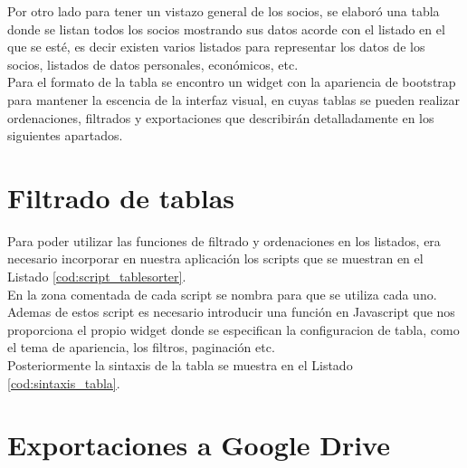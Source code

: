



Por otro lado para tener un vistazo general de los socios, se elaboró una tabla donde se listan todos los socios mostrando sus datos acorde con el listado en el que se esté, es decir existen varios listados para representar los 
datos de los socios, listados de datos personales, económicos, etc.\\

Para el formato de la tabla se encontro un widget con la  apariencia de bootstrap para mantener la escencia de la interfaz visual, en cuyas tablas se pueden
realizar ordenaciones, filtrados y exportaciones que describirán detalladamente en los siguientes apartados.

\section{Filtrado de tablas}
\label{4:sec8}
Para poder utilizar las funciones de filtrado y ordenaciones en los listados, era necesario incorporar en nuestra aplicación los scripts que se muestran en el Listado \ref{cod:script_tablesorter}.\\



En la zona comentada de cada script se nombra para que se utiliza cada uno. Ademas de estos script es necesario introducir una función en Javascript que nos  proporciona el propio widget donde se especifican la configuracion de 
tabla, como el tema de apariencia, los filtros, paginación etc.\\

Posteriormente la sintaxis de la tabla se muestra en el Listado \ref{cod:sintaxis_tabla}.\\



\section{Exportaciones a Google Drive}
\label{4:sec9}

